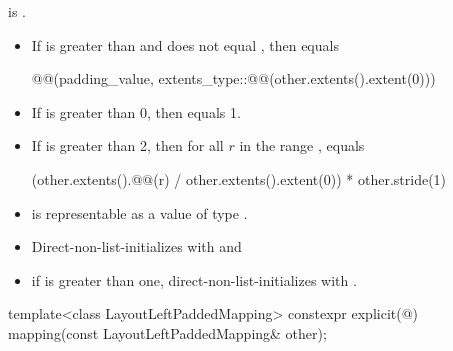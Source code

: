 \begin{itemdescr}
\pnum
\constraints
{} is .

\pnum
\expects
\begin{itemize}
\item
If  is greater than  and
 does not equal ,
then  equals
\begin{codeblock}
@@(padding_value,
                        extents_type::@@(other.extents().extent(0)))
\end{codeblock}
\item
If  is greater than 0,
then  equals 1.
\item
If  is greater than 2,
then for all $r$ in the range ,
 equals
\begin{codeblock}
(other.extents().@@(r) / other.extents().extent(0)) * other.stride(1)
\end{codeblock}
\item
{} is representable as
a value of type .
\end{itemize}

\pnum
\effects
\begin{itemize}
\item
Direct-non-list-initializes  with  and
\item
if  is greater than one,
direct-non-list-initializes  with
.
\end{itemize}
\end{itemdescr}

%
\begin{itemdecl}
template<class LayoutLeftPaddedMapping>
  constexpr explicit(@\seebelow@)
    mapping(const LayoutLeftPaddedMapping& other);
\end{itemdecl}

